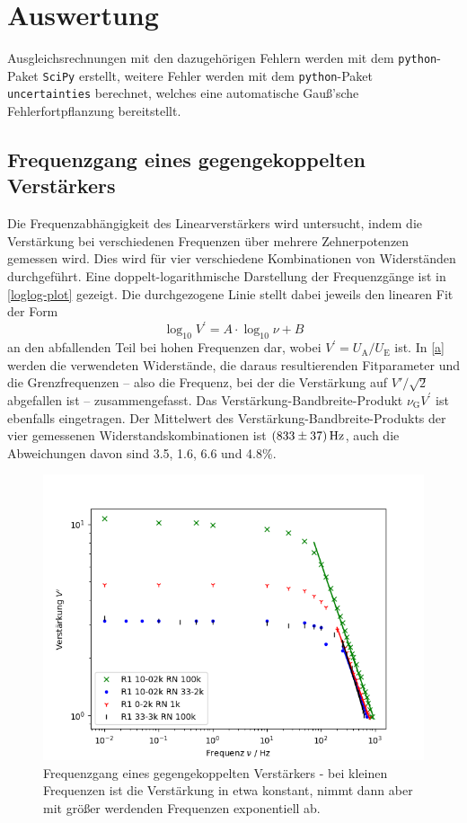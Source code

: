 \section{Auswertung}
\label{sec:evaluation}
Ausgleichsrechnungen mit den dazugehörigen Fehlern werden mit dem \texttt{python}-Paket \texttt{SciPy} \cite{scipy} erstellt, weitere Fehler werden mit dem \texttt{python}-Paket \texttt{uncertainties} \cite{uncertain} berechnet, welches eine automatische Gauß'sche Fehlerfortpflanzung bereitstellt.

\subsection{Frequenzgang eines gegengekoppelten Verstärkers}
\label{Frequenzgang}
Die Frequenzabhängigkeit des Linearverstärkers wird untersucht, indem die Verstärkung bei verschiedenen Frequenzen über mehrere Zehnerpotenzen gemessen wird. Dies wird für vier verschiedene Kombinationen von Widerständen durchgeführt. Eine doppelt-logarithmische Darstellung der Frequenzgänge ist in \autoref{loglog-plot} gezeigt. Die durchgezogene Linie stellt dabei jeweils den linearen Fit der Form
\begin{equation}
	\log_{10} V^\prime = A \cdot \log_{10} \nu + B
	\label{linear_fit}
\end{equation}
an den abfallenden Teil bei hohen Frequenzen dar, wobei $V^\prime = U_\text{A} / U_\text{E}$ ist. In \autoref{a} werden die verwendeten Widerstände, die daraus resultierenden Fitparameter und die Grenzfrequenzen -- also die Frequenz, bei der die Verstärkung auf $V'/\sqrt{2}$ abgefallen ist -- zusammengefasst. Das Verstärkung-Bandbreite-Produkt $\nu_\text{G}V^\prime$ ist ebenfalls eingetragen. Der Mittelwert des Verstärkung-Bandbreite-Produkts der vier gemessenen Widerstandskombinationen ist $\SI{833 \pm 37}{\hertz}$, auch die Abweichungen davon sind 3.5, 1.6, 6.6 und 4.8\%.

\begin{figure}[h]
	\centering
	\includegraphics[width=\textwidth]{img/a.png}
	\caption{Frequenzgang eines gegengekoppelten Verstärkers - bei kleinen Frequenzen ist die Verstärkung in etwa konstant, nimmt dann aber mit größer werdenden Frequenzen exponentiell ab.}
	\label{loglog-plot}
\end{figure}


